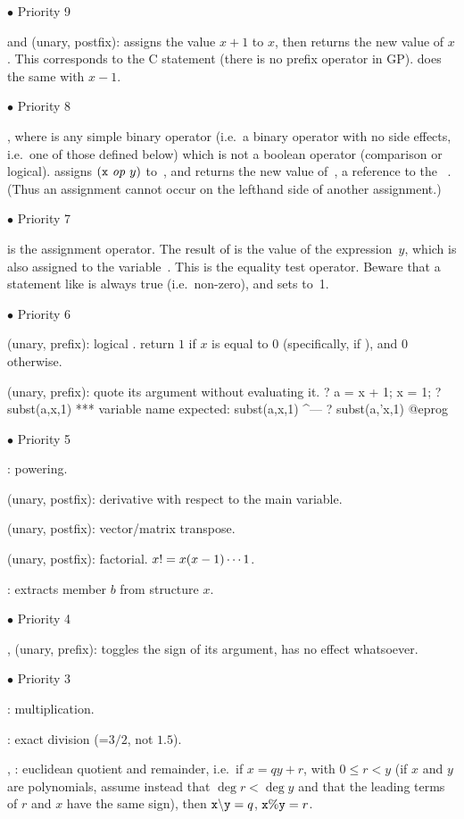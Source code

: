 \def\point#1{\noindent $\bullet$ #1\hfill\break\indent\strut}
\point{Priority 9}
%
\kbd{++} and \kbd{--} (unary, postfix):  assigns the value $x+1$ to
$x$, then returns the new value of $x$. This corresponds to the C
statement  (there is no prefix \kbd{++} operator in GP).
 does the same with $x-1$.

\point{Priority 8}
%
, where  is any simple binary operator
(i.e.~a binary operator with no side effects, i.e.~one of those defined below)
which is not a boolean operator (comparison or logical).
 assigns $({\tt x}~\hbox{\it op\/}~y)$ to~,
and returns the new value of~,  a reference to the
~. (Thus an assignment cannot occur on the lefthand
side of another assignment.)

\point{Priority 7}
%
\kbd{=} is the assignment operator. The result of  is the value
of the expression~$y$, which is also assigned to the variable~. This
is  the equality test operator. Beware that a statement like
 is always true (i.e.~non-zero), and sets  to~1.

\point{Priority 6}
%
\kbd{!} (unary, prefix): logical .  return $1$ if $x$ is
equal to $0$ (specifically, if ), and $0$ otherwise.

 (unary, prefix): quote its argument without evaluating it.
\bprog
? a = x + 1; x = 1;
? subst(a,x,1)
  ***   variable name expected: subst(a,x,1)
                                        ^---
? subst(a,'x,1)
@eprog

\point{Priority 5}
%
\kbd{\pow}: powering.

 (unary, postfix): derivative with respect to the main variable.

\strut\kbd{\til} (unary, postfix): vector/matrix transpose.

\kbd{!} (unary, postfix): factorial. $x{\tt !}=x(x-1)\cdots 1$.

:  extracts member $b$ from structure $x$.

\point{Priority 4}
%
\kbd{+}, \kbd{-} (unary, prefix): \kbd{-} toggles the sign of its argument,
\kbd{+} has no effect whatsoever.

\point{Priority 3}
%
\kbd{*}: multiplication.

\kbd{/}: exact division (=$3/2$, not $1.5$).

\kbd{\bs}, \kbd{\%}: euclidean quotient and remainder, i.e.~if $x =
qy + r$, with $0\le r < y$ (if $x$ and $y$ are polynomials, assume instead
that $\deg r< \deg y$ and that the leading terms of $r$ and $x$ have the
same sign), then $\kbd{x \b{ } y} = q$, ${\tt x\%y} = r$.

